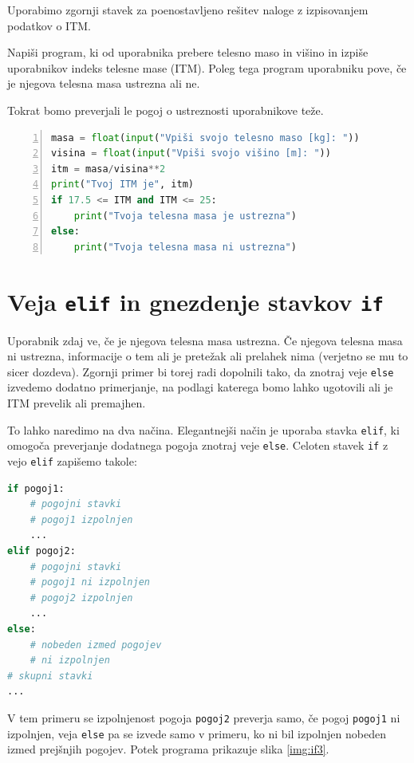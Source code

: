 Uporabimo zgornji stavek za poenostavljeno rešitev naloge z izpisovanjem podatkov o ITM.
\begin{zgled}
Napiši program, ki od uporabnika prebere telesno maso in višino in izpiše uporabnikov indeks telesne mase (ITM). Poleg tega program uporabniku pove, če je njegova telesna masa ustrezna ali ne. 
\end{zgled}
\begin{resitev}
Tokrat bomo preverjali le pogoj o ustreznosti uporabnikove teže. 
\begin{lstlisting}[language=Python, showstringspaces=false,numbers=left]
masa = float(input("Vpiši svojo telesno maso [kg]: "))
visina = float(input("Vpiši svojo višino [m]: "))
itm = masa/visina**2
print("Tvoj ITM je", itm)
if 17.5 <= ITM and ITM <= 25:
    print("Tvoja telesna masa je ustrezna")
else:
    print("Tvoja telesna masa ni ustrezna")
\end{lstlisting}
\end{resitev}

\section{Veja \texttt{elif} in gnezdenje stavkov \texttt{if}}

Uporabnik zdaj ve, če je njegova telesna masa ustrezna. Če njegova telesna masa ni ustrezna, informacije o tem ali je pretežak ali prelahek nima (verjetno se mu to sicer dozdeva). Zgornji primer bi torej radi dopolnili tako, da znotraj veje \texttt{else} izvedemo dodatno primerjanje, na podlagi katerega bomo lahko ugotovili ali je ITM prevelik ali premajhen.

To lahko naredimo na dva načina. Elegantnejši način je uporaba stavka \texttt{elif}, ki omogoča preverjanje dodatnega pogoja znotraj veje \texttt{else}. Celoten stavek \texttt{if} z vejo \texttt{elif} zapišemo takole:
\begin{lstlisting}[language=Python, showstringspaces=false]
if pogoj1:
    # pogojni stavki
    # pogoj1 izpolnjen
    ...
elif pogoj2:
    # pogojni stavki
    # pogoj1 ni izpolnjen
    # pogoj2 izpolnjen
    ...
else:
    # nobeden izmed pogojev
    # ni izpolnjen
# skupni stavki
...
\end{lstlisting}
V tem primeru se izpolnjenost pogoja \texttt{pogoj2} preverja samo, če pogoj \texttt{pogoj1} ni izpolnjen, veja \texttt{else} pa se izvede samo v primeru, ko ni bil izpolnjen nobeden izmed prejšnjih pogojev. Potek programa prikazuje slika \ref{img:if3}.

